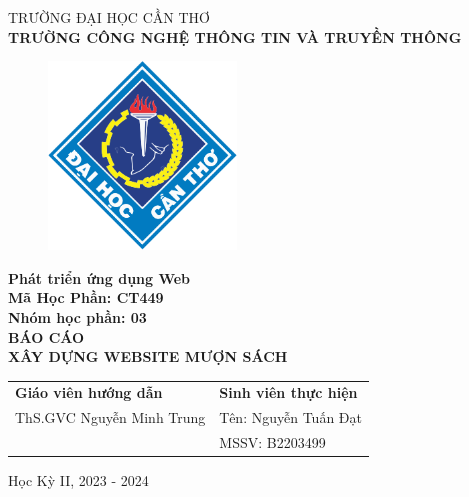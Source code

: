 \begin{titlepage}
  \begin{center}
    \vspace{-6pt}TRƯỜNG ĐẠI HỌC CẦN THƠ \\
    \textbf{\fontsize{16pt}{0pt}\selectfont TRƯỜNG CÔNG NGHỆ THÔNG TIN VÀ TRUYỀN THÔNG}
    \begin{figure}[H]
      \centering
      \includegraphics[width=5cm]{images/logo-ctu.png}
    \end{figure}
    \textbf{Phát triển ứng dụng Web} \\
    \textbf{Mã Học Phần: CT449} \\
    \textbf{Nhóm học phần: 03} \\
    \vspace{3.5cm}
    \textbf{\fontsize{16pt}{0pt}\selectfont BÁO CÁO} \\
    \textbf{\fontsize{18pt}{0pt}\selectfont XÂY DỰNG WEBSITE MƯỢN SÁCH} \\
    \vspace{4.5cm}
    \newcommand{\MyIndent}{\hspace{1cm}}
    \begin{tabular}{p{8cm} l}
      \textbf{Giáo viên hướng dẫn}        & \textbf{Sinh viên thực hiện}  \\
      \MyIndent ThS.GVC Nguyễn Minh Trung & \MyIndent Tên: Nguyễn Tuấn Đạt \\
                                          & \MyIndent MSSV: B2203499
    \end{tabular}


    \vspace{2cm}
    \fontsize{14pt}{0pt}\selectfont Học Kỳ II, 2023 - 2024
  \end{center}
\end{titlepage}
\cleardoublepage
